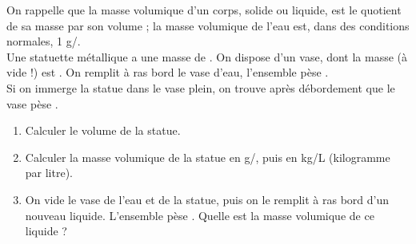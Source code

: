 \bigskip


\begin{exercice} %
   On rappelle que la masse volumique d'un corps, solide ou liquide, est le quotient de sa masse par son volume ; la masse volumique de l'eau est, dans des conditions normales, 1 g/\ucmc{}. \\
   Une statuette métallique a une masse de . On dispose d'un vase, dont la masse (à vide !) est . On remplit à ras bord le vase d'eau, l'ensemble pèse . \\
   Si on immerge la statue dans le vase plein, on trouve après débordement que le vase pèse .
   \begin{enumerate}
      \item Calculer le volume de la statue.
      \item Calculer la masse volumique de la statue en g/\ucmc{}, puis en kg/L (kilogramme par litre).
      \item On vide le vase de l'eau et de la statue, puis on le remplit à ras bord d'un nouveau liquide. L'ensemble pèse . Quelle est la masse volumique de ce liquide ?
   \end{enumerate}
\end{exercice} 

